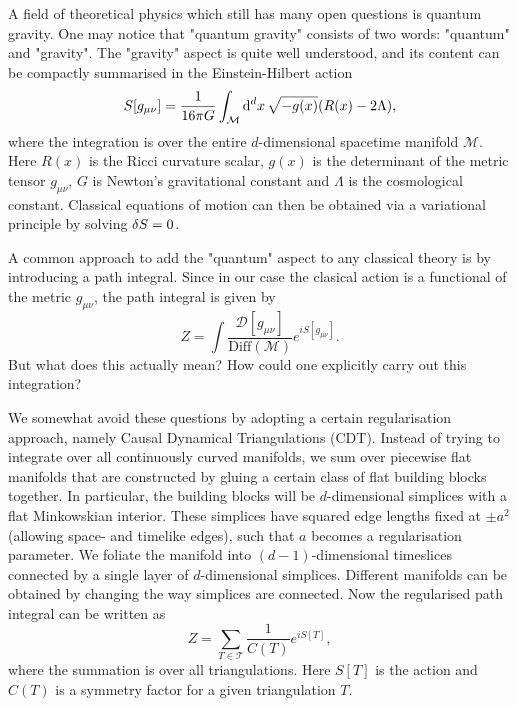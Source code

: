 A field of theoretical physics which still has many open questions is quantum gravity. One may notice that "quantum gravity" consists of two words: "quantum" and "gravity". The "gravity" aspect is quite well understood, and its content can be compactly summarised in the Einstein-Hilbert action
\begin{equation}
    S[g_{\mu \nu}]
    =
    \frac{1}{16 \pi G}
    \int_{\mathcal{M}} \dd[d]{x} \sqrt{-g(x)}
    \qty(R(x) - 2 \Lambda)
    ,
\end{equation}
where the integration is over the entire $d$-dimensional spacetime manifold $\mathcal{M}$. Here $R(x)$ is the Ricci curvature scalar, $g(x)$ is the determinant of the metric tensor $g_{\mu \nu}$, $G$ is Newton's gravitational constant and $\Lambda$ is the cosmological constant. Classical equations of motion can then be obtained via a variational principle by solving $\variation{S} = 0$.

A common approach to add the "quantum" aspect to any classical theory is by introducing a path integral. Since in our case the clasical action is a functional of the metric $g_{\mu \nu}$, the path integral is given by
\begin{equation}
    Z
    =
    \int \frac{\mathcal{D}[g_{\mu \nu}]}{\text{Diff}(\mathcal{M})}
    e^{i S[g_{\mu \nu}]}
    .
\end{equation}
But what does this actually mean? How could one explicitly carry out this integration?

We somewhat avoid these questions by adopting a certain regularisation approach, namely Causal Dynamical Triangulations (CDT). Instead of trying to integrate over all continuously curved manifolds, we sum over piecewise flat manifolds that are constructed by gluing a certain class of flat building blocks together. In particular, the building blocks will be $d$-dimensional simplices with a flat Minkowskian interior. These simplices have squared edge lengths fixed at $\pm a^2$ (allowing space- and timelike edges), such that $a$ becomes a regularisation parameter. We foliate the manifold into $(d - 1)$-dimensional timeslices connected by a single layer of $d$-dimensional simplices. Different manifolds can be obtained by changing the way simplices are connected. Now the regularised path integral can be written as
\begin{equation}
    Z
    =
    \sum_{T \in \mathcal{T}} \frac{1}{C(T)} e^{i S[T]}
    ,
\end{equation}
where the summation is over all triangulations. Here $S[T]$ is the action and $C(T)$ is a symmetry factor for a given triangulation $T$.

